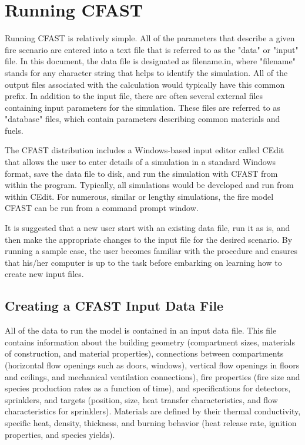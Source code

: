 
\chapter{Running CFAST}

Running CFAST is relatively simple. All of the parameters that describe a given fire scenario are entered into a text file that is referred to as the "data" or "input" file. In this document, the data file is designated as filename.in, where "filename" stands for any character string that helps to identify the simulation. All of the output files associated with the calculation would typically have this common prefix. In addition to the input file, there are often several external files containing input parameters for the simulation. These files are referred to as "database" files, which contain parameters describing common materials and fuels.

The CFAST distribution includes a Windows-based input editor called CEdit that allows the user to enter details of a simulation in a standard Windows format, save the data file to disk, and run the simulation with CFAST from within the program.  Typically, all simulations would be developed and run from within CEdit.  For numerous, similar or lengthy simulations, the fire model CFAST can be run from a command prompt window.

It is suggested that a new user start with an existing data file, run it as is, and then make the appropriate changes to the input file for the desired scenario. By running a sample case, the user becomes familiar with the procedure and ensures that his/her computer is up to the task before embarking on learning how to create new input files.

\section{Creating a CFAST Input Data File}

All of the data to run the model is contained in an input data file. This file contains information about the building geometry (compartment sizes, materials of construction, and material properties), connections between compartments (horizontal flow openings such as doors, windows), vertical flow openings in floors and ceilings, and mechanical ventilation connections), fire properties (fire size and species production rates as a function of time), and specifications for detectors, sprinklers, and targets (position, size, heat transfer characteristics, and flow characteristics for sprinklers). Materials are defined by their thermal conductivity, specific heat, density, thickness, and burning behavior (heat release rate, ignition properties, and species yields).

